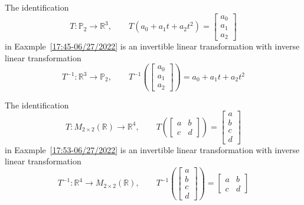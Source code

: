 \documentclass{beamer}
\theoremstyle{definition}
\theoremstyle{remark}
\begin{document}
\begin{frame}[t]
\begin{example}
The identification
\[
T:\mathbb P_2\to\mathbb R^3,\qquad T(a_0+a_1t+a_2t^2)=\begin{bmatrix}
a_0\\a_1\\a_2
\end{bmatrix}
\]
in Eaxmple~\ref{17:45-06/27/2022} is an invertible linear transformation with inverse linear transformation
\[
T^{-1}:\mathbb R^3\to\mathbb P_2,\qquad T^{-1}\left(\begin{bmatrix}
a_0\\a_1\\a_2
\end{bmatrix}\right)=a_0+a_1t+a_2t^2
\]
\end{example}
\end{frame}

\begin{frame}[t]
\begin{example}
The identification
\[
T:M_{2\times2}(\mathbb R)\to\mathbb R^4,\qquad
T\left(\begin{bmatrix}
a&b\\c&d
\end{bmatrix}\right)=\begin{bmatrix}
a\\b\\c\\d
\end{bmatrix}
\]
in Eaxmple~\ref{17:53-06/27/2022} is an invertible linear transformation with inverse linear transformation
\[
T^{-1}:\mathbb R^4\to M_{2\times2}(\mathbb R),\qquad
T^{-1}\left(\begin{bmatrix}
a\\b\\c\\d
\end{bmatrix}\right)=\begin{bmatrix}
a&b\\c&d
\end{bmatrix}
\]
\end{example}
\end{frame}
\end{document}
